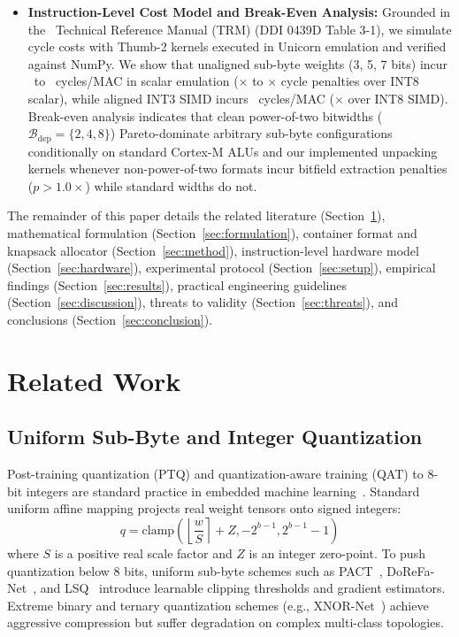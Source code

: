 \documentclass{ieeeaccess}
\begin{document}
\begin{itemize}
    \item \textbf{Instruction-Level Cost Model and Break-Even Analysis:} Grounded in the \MacroTargetArch\ Technical Reference Manual (TRM) (DDI 0439D Table 3-1), we simulate cycle costs with Thumb-2 kernels executed in Unicorn emulation and verified against NumPy. We show that unaligned sub-byte weights (3, 5, 7 bits) incur \MacroCyclesScalarUnpackLow\ to \MacroCyclesScalarUnpackHigh\ cycles/MAC in scalar emulation (\MacroPenaltyScalarUnpackLow$\times$ to \MacroPenaltyScalarUnpackHigh$\times$ cycle penalties over INT8 scalar), while aligned INT3 SIMD incurs \MacroCyclesINTThreeSIMD\ cycles/MAC (\MacroPenaltyINTThreeSIMD$\times$ over INT8 SIMD). Break-even analysis indicates that clean power-of-two bitwidths ($\mathcal{B}_{\text{dep}} = \{2, 4, 8\}$) Pareto-dominate arbitrary sub-byte configurations conditionally on standard Cortex-M ALUs and our implemented unpacking kernels whenever non-power-of-two formats incur bitfield extraction penalties ($p > 1.0\times$) while standard widths do not.
\end{itemize}

The remainder of this paper details the related literature (Section~\ref{sec:related}), mathematical formulation (Section~\ref{sec:formulation}), container format and knapsack allocator (Section~\ref{sec:method}), instruction-level hardware model (Section~\ref{sec:hardware}), experimental protocol (Section~\ref{sec:setup}), empirical findings (Section~\ref{sec:results}), practical engineering guidelines (Section~\ref{sec:discussion}), threats to validity (Section~\ref{sec:threats}), and conclusions (Section~\ref{sec:conclusion}).

\section{Related Work}
\label{sec:related}

\subsection{Uniform Sub-Byte and Integer Quantization}
Post-training quantization (PTQ) and quantization-aware training (QAT) to 8-bit integers are standard practice in embedded machine learning~\cite{jacob2018quantization, nagel2019datafree}. Standard uniform affine mapping projects real weight tensors onto signed integers:
\begin{equation}
q = \text{clamp}\left(\left\lfloor \frac{w}{S} \right\rceil + Z, -2^{b-1}, 2^{b-1}-1\right)
\end{equation}
where $S$ is a positive real scale factor and $Z$ is an integer zero-point. To push quantization below 8 bits, uniform sub-byte schemes such as PACT~\cite{choi2018pact}, DoReFa-Net~\cite{zhou2016dorefa}, and LSQ~\cite{esser2020lsq, bhalgat2020lsqplus} introduce learnable clipping thresholds and gradient estimators. Extreme binary and ternary quantization schemes (e.g., XNOR-Net~\cite{rastegari2016xnornet}) achieve aggressive compression but suffer degradation on complex multi-class topologies.
\end{document}

